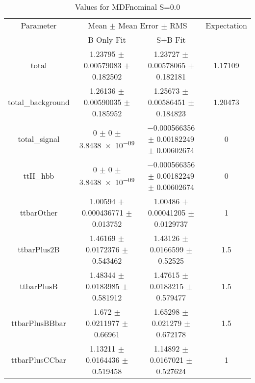 \begin{table}
\centering
\caption{Values for MDFnominal S=0.0}
\begin{tabular}{cccc}
\toprule
Parameter & \multicolumn{2}{c}{Mean $\pm$ Mean Error $\pm$ RMS} & Expectation\\
 & B-Only Fit & S+B Fit & \\
\midrule
total & \num{1.23795} $\pm$ \num{0.00579083} $\pm$ \num{0.182502} & \num{1.23727} $\pm$ \num{0.00578065} $\pm$ \num{0.182181} & \num{1.17109}\\
total\_background & \num{1.26136} $\pm$ \num{0.00590035} $\pm$ \num{0.185952} & \num{1.25673} $\pm$ \num{0.00586451} $\pm$ \num{0.184823} & \num{1.20473}\\
total\_signal & \num{0} $\pm$ \num{0} $\pm$ \num{3.8438e-09} & \num{-0.000566356} $\pm$ \num{0.00182249} $\pm$ \num{0.00602674} & \num{0}\\
ttH\_hbb & \num{0} $\pm$ \num{0} $\pm$ \num{3.8438e-09} & \num{-0.000566356} $\pm$ \num{0.00182249} $\pm$ \num{0.00602674} & \num{0}\\
ttbarOther & \num{1.00594} $\pm$ \num{0.000436771} $\pm$ \num{0.013752} & \num{1.00486} $\pm$ \num{0.00041205} $\pm$ \num{0.0129737} & \num{1}\\
ttbarPlus2B & \num{1.46169} $\pm$ \num{0.0172376} $\pm$ \num{0.543462} & \num{1.43126} $\pm$ \num{0.0166599} $\pm$ \num{0.52525} & \num{1.5}\\
ttbarPlusB & \num{1.48344} $\pm$ \num{0.0183985} $\pm$ \num{0.581912} & \num{1.47615} $\pm$ \num{0.0183215} $\pm$ \num{0.579477} & \num{1.5}\\
ttbarPlusBBbar & \num{1.672} $\pm$ \num{0.0211977} $\pm$ \num{0.66961} & \num{1.65298} $\pm$ \num{0.021279} $\pm$ \num{0.672178} & \num{1.5}\\
ttbarPlusCCbar & \num{1.13211} $\pm$ \num{0.0164436} $\pm$ \num{0.519458} & \num{1.14892} $\pm$ \num{0.0167021} $\pm$ \num{0.527624} & \num{1}\\
\bottomrule
\end{tabular}
\end{table}